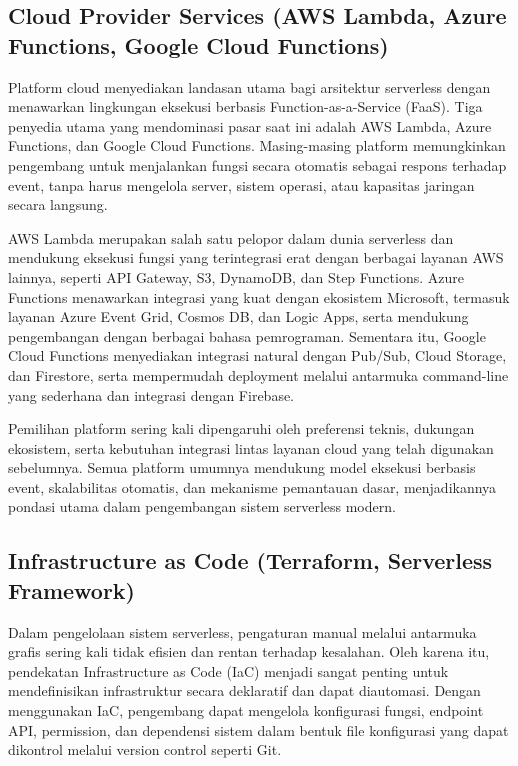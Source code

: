 \subsection{Cloud Provider Services (AWS Lambda, Azure Functions, Google Cloud Functions)}

Platform cloud menyediakan landasan utama bagi arsitektur serverless dengan menawarkan lingkungan eksekusi berbasis Function-as-a-Service (FaaS). Tiga penyedia utama yang mendominasi pasar saat ini adalah AWS Lambda, Azure Functions, dan Google Cloud Functions. Masing-masing platform memungkinkan pengembang untuk menjalankan fungsi secara otomatis sebagai respons terhadap event, tanpa harus mengelola server, sistem operasi, atau kapasitas jaringan secara langsung.

AWS Lambda merupakan salah satu pelopor dalam dunia serverless dan mendukung eksekusi fungsi yang terintegrasi erat dengan berbagai layanan AWS lainnya, seperti API Gateway, S3, DynamoDB, dan Step Functions. Azure Functions menawarkan integrasi yang kuat dengan ekosistem Microsoft, termasuk layanan Azure Event Grid, Cosmos DB, dan Logic Apps, serta mendukung pengembangan dengan berbagai bahasa pemrograman. Sementara itu, Google Cloud Functions menyediakan integrasi natural dengan Pub/Sub, Cloud Storage, dan Firestore, serta mempermudah deployment melalui antarmuka command-line yang sederhana dan integrasi dengan Firebase.

Pemilihan platform sering kali dipengaruhi oleh preferensi teknis, dukungan ekosistem, serta kebutuhan integrasi lintas layanan cloud yang telah digunakan sebelumnya. Semua platform umumnya mendukung model eksekusi berbasis event, skalabilitas otomatis, dan mekanisme pemantauan dasar, menjadikannya pondasi utama dalam pengembangan sistem serverless modern.

\subsection{Infrastructure as Code (Terraform, Serverless Framework)}

Dalam pengelolaan sistem serverless, pengaturan manual melalui antarmuka grafis sering kali tidak efisien dan rentan terhadap kesalahan. Oleh karena itu, pendekatan Infrastructure as Code (IaC) menjadi sangat penting untuk mendefinisikan infrastruktur secara deklaratif dan dapat diautomasi. Dengan menggunakan IaC, pengembang dapat mengelola konfigurasi fungsi, endpoint API, permission, dan dependensi sistem dalam bentuk file konfigurasi yang dapat dikontrol melalui version control seperti Git.

